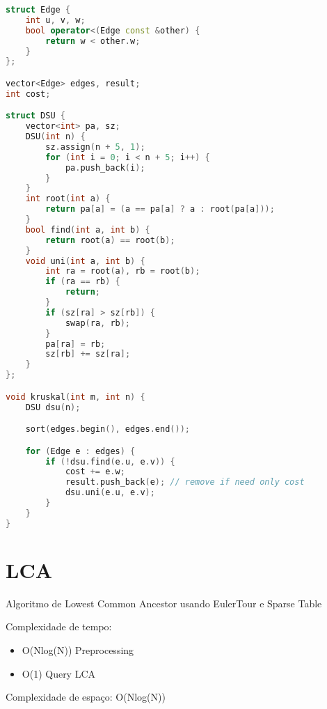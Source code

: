 \documentclass[11pt, a4paper, oneside]{book}
\begin{document}
\hfill

\begin{multicols}{2}
\begin{lstlisting}[language=C++]
struct Edge {
    int u, v, w;
    bool operator<(Edge const &other) {
        return w < other.w;
    }
};

vector<Edge> edges, result;
int cost;

struct DSU {
    vector<int> pa, sz;
    DSU(int n) {
        sz.assign(n + 5, 1);
        for (int i = 0; i < n + 5; i++) {
            pa.push_back(i);
        }
    }
    int root(int a) {
        return pa[a] = (a == pa[a] ? a : root(pa[a]));
    }
    bool find(int a, int b) {
        return root(a) == root(b);
    }
    void uni(int a, int b) {
        int ra = root(a), rb = root(b);
        if (ra == rb) {
            return;
        }
        if (sz[ra] > sz[rb]) {
            swap(ra, rb);
        }
        pa[ra] = rb;
        sz[rb] += sz[ra];
    }
};

void kruskal(int m, int n) {
    DSU dsu(n);

    sort(edges.begin(), edges.end());

    for (Edge e : edges) {
        if (!dsu.find(e.u, e.v)) {
            cost += e.w;
            result.push_back(e); // remove if need only cost
            dsu.uni(e.u, e.v);
        }
    }
}
\end{lstlisting}
\end{multicols}

\hfill

\section{LCA}


Algoritmo de Lowest Common Ancestor usando EulerTour e Sparse Table



Complexidade de tempo:



\begin{itemize}
\item O(Nlog(N)) Preprocessing
\item O(1) Query LCA
\end{itemize}



Complexidade de espaço: O(Nlog(N))

\hfill
\end{document}
